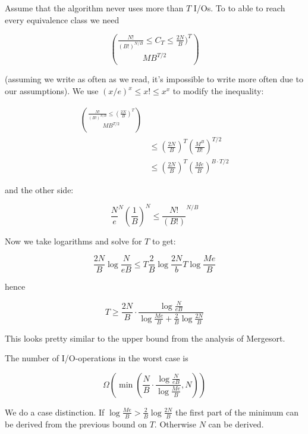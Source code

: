 Assume that the algorithm never uses more than $T$ I/Os. To to able to reach every equivalence class we need

\[\frac{N!}{(B!)^{N/B}} \leq C_T \leq \frac{2N}{B})^T \choose{M}{B}^{T/2}\]

(assuming we write as often as we read, it's impossible to write more often due to our assumptions). We use $(x/e)^x\leq x! \leq x^x$ to modify the inequality:

\begin{align*}
\frac{N!}{(B!)^{N/B}} \leq (\frac{2N}{B})^T \choose{M}{B}^{T/2}\\
	&\leq (\frac{2N}{B})^T (\frac{M^B}{B!})^{T/2}\\
	&\leq (\frac{2N}{B})^T (\frac{Me}{B})^{B \cdot T/2}
\end{align*}

and the other side:

\[\frac{N}{e}^N (\frac{1}{B})^N \leq \frac{N!}{(B!)}^{N/B}\]

Now we take logarithms and solve for $T$ to get:

\[\frac{2N}{B} \log \frac{N}{eB} \leq T\frac{2}{B} \log \frac{2N}{b}  T \log \frac{Me}{B}\]

hence

\[T\geq \frac{2N}{B} \cdot \frac{\log \frac{N}{eB}}{\log \frac{Me}{B} + \frac{2}{B} \log \frac{2N}{B}}\]

This looks pretty similar to the upper bound from the analysis of Mergesort.

\begin{thm} The number of I/O-operations in the worst case is 

\[\Omega(\min \left(\frac{N}{B} \cdot \frac{\log \frac{N}{eB}}{\log \frac{Me}{B}}, N\right))\]
\end{thm}

\begin{pr} We do a case distinction. If $\log \frac{Me}{B} > \frac 2B \log \frac{2N}{B}$ the first part of the minimum can be derived from the previous bound on $T$. Otherwise $N$ can be derived.
\end{pr}

